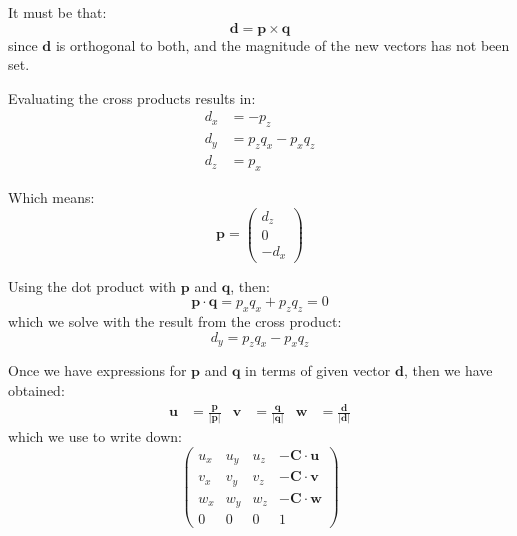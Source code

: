 \documentclass[11pt]{article}
\begin{document}
It must be that:
\[
  \textbf{d} = \textbf{p} \times \textbf{q} 
\]
since $\textbf{d}$ is orthogonal to both, and the magnitude of the new vectors has not been set.

Evaluating the cross products results in:
\begin{align*}
  d_x &= -p_z \\
  d_y &= p_zq_x - p_xq_z \\
  d_z &= p_x
\end{align*}

Which means:
\[
  \textbf{p} = \begin{pmatrix} d_z \\ 0 \\ -d_x \end{pmatrix} 
\]

Using the dot product with $\textbf{p}$ and $\textbf{q}$, then:
\[
  \textbf{p} \cdot \textbf{q} = p_xq_x + p_zq_z = 0
\]
which we solve with the result from the cross product:
\[
  d_y = p_zq_x - p_xq_z
\]

Once we have expressions for $\textbf{p}$ and $\textbf{q}$ in terms of given vector $\textbf{d}$, then we have obtained:
\begin{align*}
  \textbf{u} &= \frac{\textbf{p}}{\lvert \textbf{p} \rvert} &
  \textbf{v} &= \frac{\textbf{q}}{\lvert \textbf{q} \rvert} &
  \textbf{w} &= \frac{\textbf{d}}{\lvert \textbf{d} \rvert}
\end{align*}
which we use to write down:
\[
  \begin{pmatrix}
    u_x & u_y & u_z & -\textbf{C} \cdot \textbf{u} \\ 
    v_x & v_y & v_z & -\textbf{C} \cdot \textbf{v} \\ 
    w_x & w_y & w_z & -\textbf{C} \cdot \textbf{w} \\ 
    0 & 0 & 0 & 1
  \end{pmatrix}
\]
\end{document}
